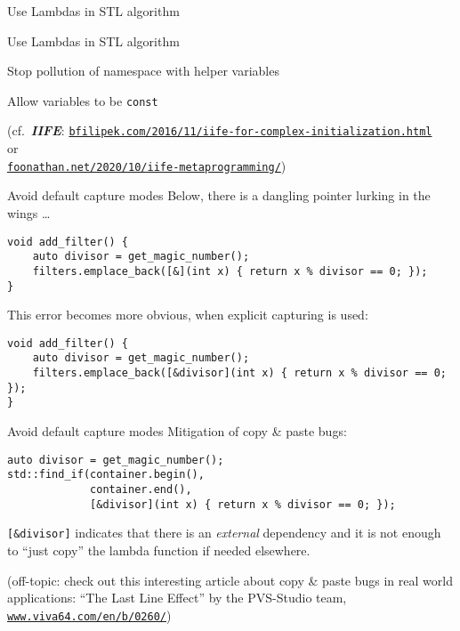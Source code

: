 \begin{frame}[fragile]{Use Lambdas in STL algorithm}
\end{frame}

\begin{frame}[fragile]{Use Lambdas in STL algorithm}
\end{frame}

\begin{frame}[fragile]{Stop pollution of namespace with helper variables}
\end{frame}

\begin{frame}[fragile]{Allow variables to be \texttt{const}}

    \begin{center}
        \footnotesize
        (cf.\ \textbf{\textit{IIFE}}: \href{https://www.bfilipek.com/2016/11/iife-for-complex-initialization.html}{\texttt{bfilipek.com/2016/11/iife-for-complex-initialization.html}} \\ or \\ \href{https://foonathan.net/2020/10/iife-metaprogramming/}{\texttt{foonathan.net/2020/10/iife-metaprogramming/}})
    \end{center}
\end{frame}

\begin{frame}[fragile]{Avoid default capture modes}
    Below, there is a dangling pointer lurking in the wings \ldots
    \begin{lstlisting}
void add_filter() {
    auto divisor = get_magic_number();
    filters.emplace_back([&](int x) { return x % divisor == 0; });
}
    \end{lstlisting}

    This error becomes more obvious, when explicit capturing is used:
    \begin{lstlisting}
void add_filter() {
    auto divisor = get_magic_number();
    filters.emplace_back([&divisor](int x) { return x % divisor == 0; });
}
    \end{lstlisting}
\end{frame}

\begin{frame}[fragile]{Avoid default capture modes}
    Mitigation of copy \& paste bugs:
    \begin{lstlisting}
auto divisor = get_magic_number();
std::find_if(container.begin(),
             container.end(),
             [&divisor](int x) { return x % divisor == 0; });
    \end{lstlisting}

    \texttt{[\&divisor]} indicates that there is an \textit{external} dependency and it is not enough to \enquote{just copy} the lambda function if needed elsewhere.

    {\footnotesize (off-topic: check out this interesting article about copy \& paste bugs in real world applications: \enquote{The Last Line Effect} by the PVS-Studio team, \href{https://www.viva64.com/en/b/0260/}{\texttt{www.viva64.com/en/b/0260/}})}  
\end{frame}

